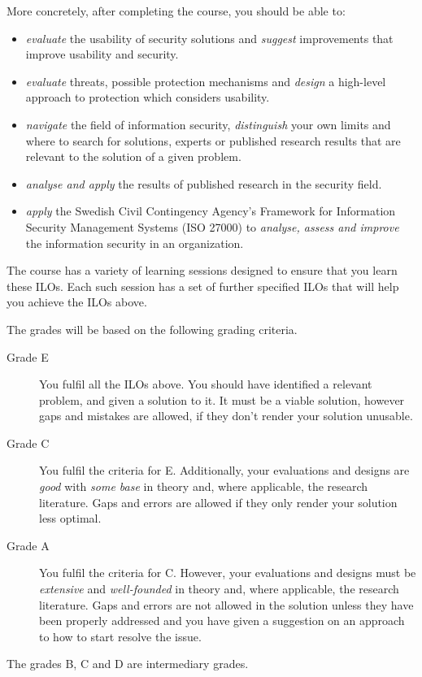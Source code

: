 \mode*

More concretely, after completing the course, you should be able to:
\begin{frame}
\begin{itemize}
  \item \emph{evaluate} the usability of security solutions and \emph{suggest} 
    improvements that improve usability and security.
  \item \emph{evaluate} threats, possible protection mechanisms and 
    \emph{design} a high-level approach to protection which considers 
    usability.
  \item \emph{navigate} the field of information security, \emph{distinguish} 
    your own limits and where to search for solutions, \eg experts or published 
    research results that are relevant to the solution of a given problem.
  \item \emph{analyse and apply} the results of published research in the 
    security field.
  \item \emph{apply} the Swedish Civil Contingency Agency's Framework for 
    Information Security Management Systems (ISO 27000) to \emph{analyse, assess 
      and improve} the information security in an organization.
\end{itemize}
\end{frame}
The course has a variety of learning sessions designed to ensure that you learn 
these \acp{ILO}.
Each such session has a set of further specified \acp{ILO} that will help you 
achieve the \acp{ILO} above.

The grades will be based on the following grading criteria.
\begin{frame}
\begin{description}
  \item[Grade E] You fulfil all the \acp{ILO} above.
    You should have identified a relevant problem, and given a solution to it.
    It must be a viable solution, however gaps and mistakes are allowed, if 
    they don't render your solution unusable.

  \item[Grade C] You fulfil the criteria for E.
    Additionally, your evaluations and designs are \emph{good} with \emph{some 
      base} in theory and, where applicable, the research literature.
    Gaps and errors are allowed if they only render your solution less optimal.

  \item[Grade A] You fulfil the criteria for C.
    However, your evaluations and designs must be \emph{extensive} and 
    \emph{well-founded} in theory and, where applicable, the research 
    literature.
    Gaps and errors are not allowed in the solution unless they have been 
    properly addressed and you have given a suggestion on an approach to how to 
    start resolve the issue.
\end{description}
\end{frame}
The grades B, C and D are intermediary grades.

